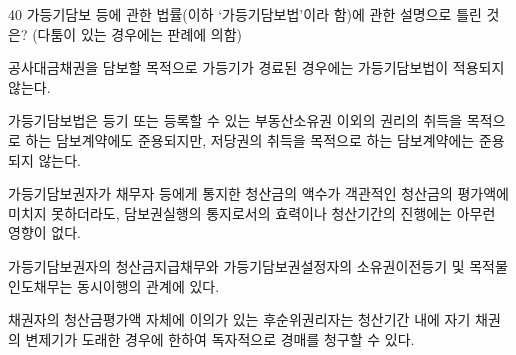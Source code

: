 \begin{question}{40}
가등기담보 등에 관한 법률(이하 ‘가등기담보법’이라 함)에 관한 설명으로 틀린 것은? (다툼이 있는 경우에는 판례에 의함)
\begin{choices}
  \item 공사대금채권을 담보할 목적으로 가등기가 경료된 경우에는 가등기담보법이 적용되지 않는다.
  \item 가등기담보법은 등기 또는 등록할 수 있는 부동산소유권 이외의 권리의 취득을 목적으로 하는 담보계약에도 준용되지만, 저당권의 취득을 목적으로 하는 담보계약에는 준용되지 않는다.
  \item 가등기담보권자가 채무자 등에게 통지한 청산금의 액수가 객관적인 청산금의 평가액에 미치지 못하더라도, 담보권실행의 통지로서의 효력이나 청산기간의 진행에는 아무런 영향이 없다.
  \item 가등기담보권자의 청산금지급채무와 가등기담보권설정자의 소유권이전등기 및 목적물인도채무는 동시이행의 관계에 있다.
  \item 채권자의 청산금평가액 자체에 이의가 있는 후순위권리자는 청산기간 내에 자기 채권의 변제기가 도래한 경우에 한하여 독자적으로 경매를 청구할 수 있다.
\end{choices}
\end{question}
